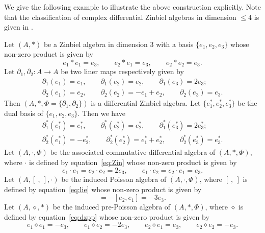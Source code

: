 \documentclass[pdftex]{sigma}
\numberwithin{equation}{section}
\begin{document}
We give the following example to illustrate the above construction explicitly.
Note that the classification of complex differential Zinbiel algebras in dimension $\leq 4$ is given in \cite{almutari2018derivations}.
\begin{Example}
 Let $(A,\ast)$ be a Zinbiel algebra in dimension 3 with a basis $\{e_1, e_2, e_3\}$ whose non-zero product is given by
 \begin{equation*}
 e_1 \ast e_1 = e_3, \qquad e_2 \ast e_1 = e_3, \qquad e_2 \ast e_2 = e_3.
 \end{equation*}
 Let $\partial_1, \partial_2\colon A \to A$ be two liner maps respectively given by
 \begin{gather*}
 \partial_1(e_1) = e_1, \qquad \partial_1(e_2) = e_2, \qquad \partial_1(e_3) = 2 e_3; \\
 \partial_2(e_1) = e_2, \qquad \partial_2(e_2) = -e_1 + e_2, \qquad \partial_2(e_3) = e_3.
 \end{gather*}
 Then $(A, \ast, \Phi = \{\partial_1, \partial_2\})$ is a differential Zinbiel algebra.
 Let $\{e_1^*, e_2^*, e_3^*\}$ be the dual basis of $\{e_1, e_2, e_3\}$.
 Then we have
 \begin{gather*}
 \partial_1^*(e_1^*) = e_1^*, \qquad \partial_1^*(e_2^*) = e_2^*, \qquad \partial_1^*(e_3^*) = 2 e_3^*; \\
 \partial_2^*(e_1^*) = -e_2^*, \qquad \partial_2^*(e_2^*) = e_1^* + e_2^*, \qquad \partial_2^*(e_3^*) = e_3^*.
 \end{gather*}
 Let $(A, \cdot, \Phi)$ be the associated commutative differential algebra of $(A, \ast, \Phi)$, where $\cdot$ is defined by equation~\eqref{eq:Zin} whose non-zero product is given by
 \begin{equation*}
 e_1 \cdot e_1 = e_2 \cdot e_2 = 2 e_3, \qquad
 e_1 \cdot e_2 = e_2 \cdot e_1 = e_3.
 \end{equation*}
 Let $(A, [\ ,\ ], \cdot)$ be the induced Poisson algebra of $(A, \cdot, \Phi)$, where $[\ ,\ ]$ is defined by equation~\eqref{eq:lie} whose non-zero product is given by
 \begin{equation*}
 [e_1, e_2] = -[e_2, e_1] = -3 e_3.
 \end{equation*}
 Let $(A, \diamond, \ast)$ be the induced pre-Poisson algebra of $(A, \ast, \Phi)$, where $\diamond$ is defined by equation~\eqref{eq:dzpp} whose non-zero product is given by
 \begin{equation*}
 e_1 \diamond e_1 = - e_3, \qquad
 e_1 \diamond e_2 = -2 e_3, \qquad
 e_2 \diamond e_1 = e_3, \qquad
 e_2 \diamond e_2 = - e_3.

\end{equation*}
\end{Example}
\end{document}
